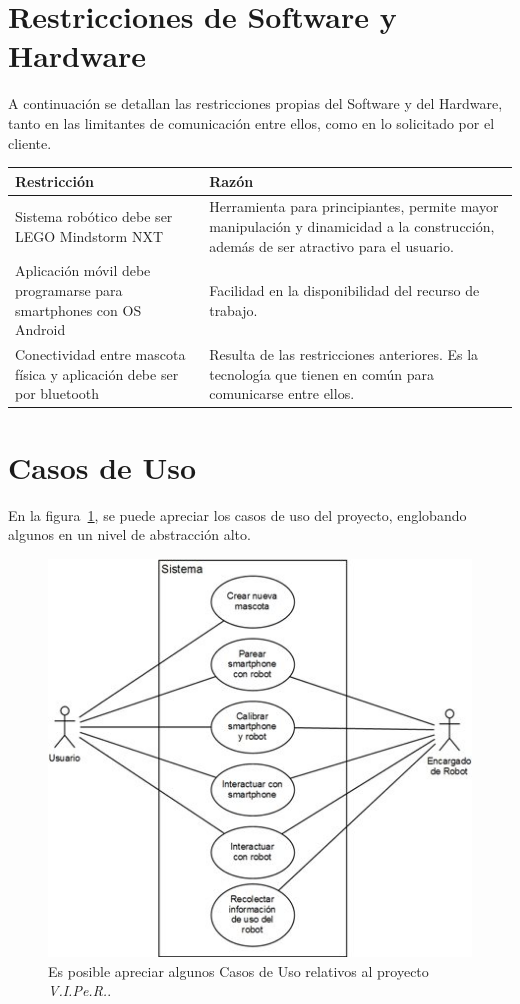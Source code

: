 \documentclass[letterpaper,12pt]{article} %
\numberwithin{equation}{section} %
\numberwithin{figure}{section} %
\numberwithin{table}{section} %
\begin{document}
\newpage
\section{Restricciones de Software y Hardware}

A continuaci\'on se detallan las restricciones propias del Software y del Hardware, tanto en las limitantes de comunicaci\'on entre ellos, como en lo solicitado por el cliente.

\begin{table}[hb!]
  \begin{tabular}{p{3cm}p{7cm}}\hline
    Restricci\'on & Raz\'on \\ \hline\hline %
    Sistema rob\'otico debe ser LEGO Mindstorm NXT & Herramienta para principiantes, permite mayor manipulaci\'on y dinamicidad a la construcci\'on, adem\'as de ser atractivo para el usuario.\\ \hline
    Aplicaci\'on m\'ovil debe programarse para smartphones con OS Android & Facilidad en la disponibilidad del recurso de trabajo. \\ \hline
    Conectividad entre mascota f\'isica y aplicaci\'on debe ser por bluetooth & Resulta de las restricciones anteriores. Es la tecnolog\'{\i}a que tienen en com\'un para comunicarse entre ellos.\\ \hline \hline
  \end{tabular}
\end{table}

\newpage
\section{Casos de Uso} %

En la figura~\ref{fig:CasoUso}, se puede apreciar los casos de uso del proyecto, englobando algunos en un nivel de abstracci\'on alto.

\begin{figure}[h!]
   \centering
     \includegraphics[scale=0.5]{CasoUso.jpg}
   \caption{Es posible apreciar algunos Casos de Uso relativos al proyecto \emph{V.I.Pe.R.}.}
   \label{fig:CasoUso}
\end{figure}
\end{document}
